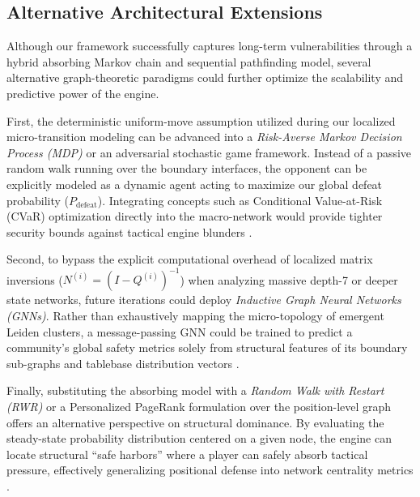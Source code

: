 \documentclass[9pt,twocolumn,twoside]{pnas-report}
\begin{document}

\subsection*{Alternative Architectural Extensions}
Although our framework successfully captures long-term vulnerabilities through a hybrid absorbing Markov chain and sequential pathfinding model, several alternative graph-theoretic paradigms could further optimize the scalability and predictive power of the engine. 

First, the deterministic uniform-move assumption utilized during our localized micro-transition modeling can be advanced into a \emph{Risk-Averse Markov Decision Process (MDP)} or an adversarial stochastic game framework. Instead of a passive random walk running over the boundary interfaces, the opponent can be explicitly modeled as a dynamic agent acting to maximize our global defeat probability ($P_{\text{defeat}}$). Integrating concepts such as Conditional Value-at-Risk (CVaR) optimization directly into the macro-network would provide tighter security bounds against tactical engine blunders \cite{risk_mdp}.

Second, to bypass the explicit computational overhead of localized matrix inversions ($N^{(i)} = (I - Q^{(i)})^{-1}$) when analyzing massive depth-7 or deeper state networks, future iterations could deploy \emph{Inductive Graph Neural Networks (GNNs)}. Rather than exhaustively mapping the micro-topology of emergent Leiden clusters, a message-passing GNN could be trained to predict a community's global safety metrics solely from structural features of its boundary sub-graphs and tablebase distribution vectors \cite{gnn_states}.

Finally, substituting the absorbing model with a \emph{Random Walk with Restart (RWR)} or a Personalized PageRank formulation over the position-level graph offers an alternative perspective on structural dominance. By evaluating the steady-state probability distribution centered on a given node, the engine can locate structural ``safe harbors'' where a player can safely absorb tactical pressure, effectively generalizing positional defense into network centrality metrics \cite{pagerank_chess}.
\end{document}
